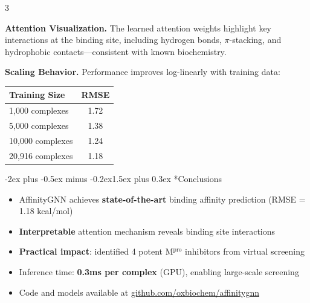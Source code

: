 \documentclass[a0paper,portrait]{article}
\makeatletter
\renewcommand{\section}{\@startsection{section}{1}{0pt}%
  {-2ex plus -0.5ex minus -0.2ex}{1.5ex plus 0.3ex}%
  {\fontsize{40}{48}\selectfont\bfseries\color{sectioncolor}}}
\newcommand{\posterbody}{\fontsize{28}{38}\selectfont}
\newcommand{\postertable}{\fontsize{26}{34}\selectfont}
\makeatother
\begin{document}
\begin{multicols}{3}
\vspace{2cm}

\textbf{Attention Visualization.} The learned attention weights highlight key interactions at the binding site, including hydrogen bonds, $\pi$-stacking, and hydrophobic contacts---consistent with known biochemistry.

\vspace{2cm}

\textbf{Scaling Behavior.} Performance improves log-linearly with training data:

\vspace{1cm}

\begin{center}
\renewcommand{\arraystretch}{1.6}
{\postertable
\begin{tabular}{@{}lc@{}}
\toprule
\textbf{Training Size} & \textbf{RMSE} \\
\midrule
1,000 complexes   & 1.72 \\
5,000 complexes   & 1.38 \\
10,000 complexes  & 1.24 \\
20,916 complexes  & 1.18 \\
\bottomrule
\end{tabular}}
\end{center}

\vspace{2cm}

\section*{Conclusions}

\posterbody

\begin{itemize}[leftmargin=1.5em, itemsep=12pt]
  \item AffinityGNN achieves \textbf{state-of-the-art} binding affinity prediction (RMSE = 1.18 kcal/mol)
  \item \textbf{Interpretable} attention mechanism reveals binding site interactions
  \item \textbf{Practical impact}: identified 4 potent M$^{\text{pro}}$ inhibitors from virtual screening
  \item Inference time: \textbf{0.3ms per complex} (GPU), enabling large-scale screening
  \item Code and models available at \url{github.com/oxbiochem/affinitygnn}
\end{itemize}


\end{multicols}
\end{document}
